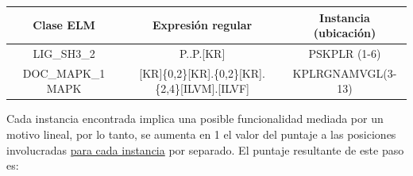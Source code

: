 \noindent 
\begin{adjustbox}{width=\textwidth}
\begin{tabular}{c|c|c} 
\textbf{Clase ELM} & \textbf{Expresión regular} & \textbf{Instancia (ubicación)}\\ \hline
LIG\_SH3\_2 & P..P.[KR] & PSKPLR (1-6)\\ 
DOC\_MAPK\_1 MAPK  & [KR]\{0,2\}[KR].\{0,2\}[KR].\{2,4\}[ILVM].[ILVF] & KPLRGNAMVGL(3-13)
\end{tabular}
\end{adjustbox}

\vspace{0.5cm}

Cada instancia encontrada implica una posible funcionalidad mediada por un motivo lineal, por lo tanto, se aumenta en 1 el valor del puntaje a las posiciones involucradas \underline{para cada instancia} por separado.
El puntaje resultante de este paso es:

